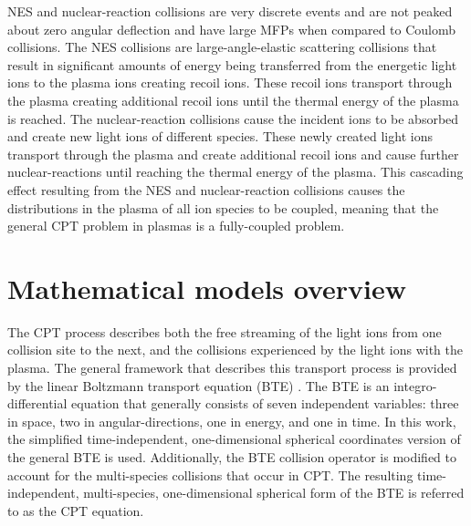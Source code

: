 \documentclass[../main.tex]{subfiles}
\begin{document}
NES and nuclear-reaction collisions are very discrete events and are not peaked about zero angular deflection and have large MFPs when compared to Coulomb collisions. The NES collisions are large-angle-elastic scattering collisions that result in significant amounts of energy being transferred from the energetic light ions to the plasma ions creating recoil ions. These recoil ions transport through the plasma creating additional recoil ions until the thermal energy of the plasma is reached. The nuclear-reaction collisions cause the incident ions to be absorbed and create new light ions of different species. These newly created light ions transport through the plasma and create additional recoil ions and cause further nuclear-reactions until reaching the thermal energy of the plasma. This cascading effect resulting from the NES and nuclear-reaction collisions causes the distributions in the plasma of all ion species to be coupled, meaning that the general CPT problem in plasmas is a fully-coupled problem.

\section{Mathematical models overview}
The CPT process describes both the free streaming of the light ions from one collision site to the next, and the collisions experienced by the light ions with the plasma. The general framework that describes this transport process is provided by the linear Boltzmann transport equation (BTE) \cite{Prinja-2010}. The BTE is an integro-differential equation that generally consists of seven independent variables: three in space, two in angular-directions, one in energy, and one in time. In this work, the simplified time-independent, one-dimensional spherical coordinates version of the general BTE is used. Additionally, the BTE collision operator is modified to account for the multi-species collisions that occur in CPT. The resulting time-independent, multi-species, one-dimensional spherical form of the BTE is referred to as the CPT equation.
\end{document}
